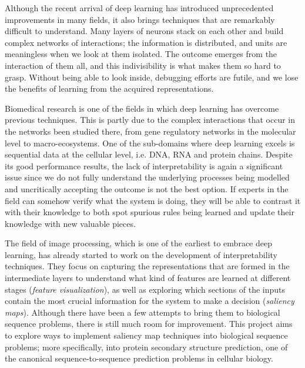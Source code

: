 Although the recent arrival of deep learning has introduced unprecedented improvements in many fields, it also brings techniques that are remarkably difficult to understand. Many layers of neurons stack on each other and build complex networks of interactions; the information is distributed, and units are meaningless when we look at them isolated. The outcome emerges from the interaction of them all, and this indivisibility is what makes them so hard to grasp. Without being able to look inside, debugging efforts are futile, and we lose the benefits of learning from the acquired representations.

Biomedical research is one of the fields in which deep learning has overcome previous techniques. This is partly due to the complex interactions that occur in the networks been studied there, from gene regulatory networks in the molecular level to macro-ecosystems. One of the sub-domains where deep learning excels is sequential data at the cellular level, i.e. DNA, RNA and protein chains. Despite its good performance results, the lack of interpretability is again a significant issue since we do not fully understand the underlying processes being modelled and uncritically accepting the outcome is not the best option. If experts in the field can somehow verify what the system is doing, they will be able to contrast it with their knowledge to both spot spurious rules being learned and update their knowledge with new valuable pieces.

The field of image processing, which is one of the earliest to embrace deep learning, has already started to work on the development of interpretability techniques. They focus on capturing the representations that are formed in the intermediate layers to understand what kind of features are learned at different stages (\textit{feature visualization}), as well as exploring which sections of the inputs contain the most crucial information for the system to make a decision (\textit{saliency maps}). Although there have been a few attempts to bring them to biological sequence problems, there is still much room for improvement. This project aims to explore ways to implement saliency map techniques into biological sequence problems; more specifically, into protein secondary structure prediction, one of the canonical sequence-to-sequence prediction problems in cellular biology.